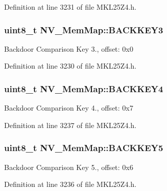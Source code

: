 Definition at line 3231 of file M\+K\+L25\+Z4.\+h.

\subsubsection[{\texorpdfstring{B\+A\+C\+K\+K\+E\+Y3}{BACKKEY3}}]{\setlength{\rightskip}{0pt plus 5cm}uint8\+\_\+t N\+V\+\_\+\+Mem\+Map\+::\+B\+A\+C\+K\+K\+E\+Y3}\hypertarget{struct_n_v___mem_map_a836e107cd6936ce8acd9279af7e9657e}{}\label{struct_n_v___mem_map_a836e107cd6936ce8acd9279af7e9657e}
Backdoor Comparison Key 3., offset\+: 0x0 

Definition at line 3230 of file M\+K\+L25\+Z4.\+h.

\subsubsection[{\texorpdfstring{B\+A\+C\+K\+K\+E\+Y4}{BACKKEY4}}]{\setlength{\rightskip}{0pt plus 5cm}uint8\+\_\+t N\+V\+\_\+\+Mem\+Map\+::\+B\+A\+C\+K\+K\+E\+Y4}\hypertarget{struct_n_v___mem_map_ae4e87676d4d9881d1d60af4176b6d6f5}{}\label{struct_n_v___mem_map_ae4e87676d4d9881d1d60af4176b6d6f5}
Backdoor Comparison Key 4., offset\+: 0x7 

Definition at line 3237 of file M\+K\+L25\+Z4.\+h.

\subsubsection[{\texorpdfstring{B\+A\+C\+K\+K\+E\+Y5}{BACKKEY5}}]{\setlength{\rightskip}{0pt plus 5cm}uint8\+\_\+t N\+V\+\_\+\+Mem\+Map\+::\+B\+A\+C\+K\+K\+E\+Y5}\hypertarget{struct_n_v___mem_map_a46e84393478a41f6958c4f382cad11b7}{}\label{struct_n_v___mem_map_a46e84393478a41f6958c4f382cad11b7}
Backdoor Comparison Key 5., offset\+: 0x6 

Definition at line 3236 of file M\+K\+L25\+Z4.\+h.

